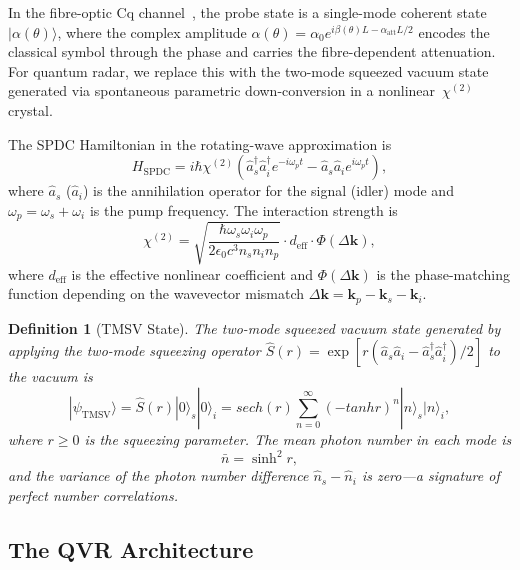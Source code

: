 \documentclass[journal]{IEEEtran}
\newtheorem{definition}{Definition}
\begin{document}
In the fibre-optic Cq channel~\cite{gautum2024rigorous}, the probe state is a single-mode coherent state~$|\alpha(\theta)\rangle$, where the complex amplitude $\alpha(\theta) = \alpha_0 e^{i\beta(\theta)L - \alpha_{\text{att}}L/2}$ encodes the classical symbol through the phase and carries the fibre-dependent attenuation. For quantum radar, we replace this with the two-mode squeezed vacuum state generated via spontaneous parametric down-conversion in a nonlinear~$\chi^{(2)}$ crystal.

The SPDC Hamiltonian in the rotating-wave approximation is
\begin{equation}\label{eq:spdc_hamiltonian}
H_{\text{SPDC}} = i\hbar\chi^{(2)}\left(\hat{a}_s^\dagger \hat{a}_i^\dagger e^{-i\omega_p t} - \hat{a}_s \hat{a}_i e^{i\omega_p t}\right),
\end{equation}
where $\hat{a}_s$ ($\hat{a}_i$) is the annihilation operator for the signal (idler) mode and $\omega_p = \omega_s + \omega_i$ is the pump frequency. The interaction strength is
\begin{equation}\label{eq:chi2_coupling}
\chi^{(2)} = \sqrt{\frac{\hbar\omega_s\omega_i\omega_p}{2\epsilon_0 c^3 n_s n_i n_p}} \cdot d_{\text{eff}} \cdot \Phi(\Delta\mathbf{k}),
\end{equation}
where $d_{\text{eff}}$ is the effective nonlinear coefficient and $\Phi(\Delta\mathbf{k})$ is the phase-matching function depending on the wavevector mismatch $\Delta\mathbf{k} = \mathbf{k}_p - \mathbf{k}_s - \mathbf{k}_i$.

\begin{definition}[TMSV State]\label{def:tmsv}
The two-mode squeezed vacuum state generated by applying the two-mode squeezing operator $\hat{S}(r) = \exp[r(\hat{a}_s\hat{a}_i - \hat{a}_s^\dagger\hat{a}_i^\dagger)/2]$ to the vacuum is
\begin{equation}\label{eq:tmsv_state}
|\psi_{\text{TMSV}}\rangle = \hat{S}(r)|0\rangle_s|0\rangle_i = sech(r)\sum_{n=0}^{\infty}(-tanh r)^n |n\rangle_s|n\rangle_i ,
\end{equation}
where $r \geq 0$ is the squeezing parameter. The mean photon number in each mode is
\begin{equation}\label{eq:mean_photon_tmsv}
\bar{n} = \sinh^2 r,
\end{equation}
and the variance of the photon number difference $\hat{n}_s - \hat{n}_i$ is zero---a signature of perfect number correlations.
\end{definition}

\subsection{The QVR Architecture}
\end{document}
